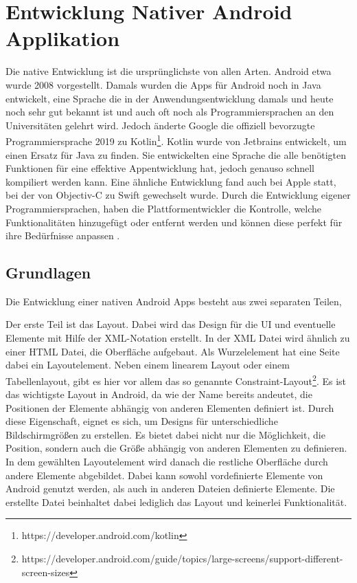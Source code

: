 \section{Entwicklung Nativer Android Applikation}
Die native Entwicklung ist die ursprünglichste von allen Arten. Android etwa wurde 2008 vorgestellt. 
Damals wurden die Apps für Android noch in Java entwickelt, eine Sprache die in der Anwendungsentwicklung damals und heute noch sehr gut bekannt ist und auch oft noch als Programmiersprachen an den Universitäten gelehrt wird. 
Jedoch änderte Google die offiziell bevorzugte Programmiersprache 2019 zu Kotlin\footnote{https://developer.android.com/kotlin}. 
Kotlin wurde von Jetbrains entwickelt, um einen Ersatz für Java zu finden. 
Sie entwickelten eine Sprache die alle benötigten Funktionen für eine effektive Appentwicklung hat, jedoch genauso schnell kompiliert werden kann. 
Eine ähnliche Entwicklung fand auch bei Apple statt, bei der von Objectiv-C zu Swift gewechselt wurde. 
Durch die Entwicklung eigener Programmiersprachen, haben die Plattformentwickler die Kontrolle, welche Funktionalitäten hinzugefügt oder entfernt werden und können diese perfekt für ihre Bedürfnisse anpassen \cite{medium_Swift_Kotlin}.

\subsection{Grundlagen}
Die Entwicklung einer nativen Android \acp{App} besteht aus zwei separaten Teilen, 

Der erste Teil ist das Layout. Dabei wird das Design für die UI und eventuelle Elemente mit Hilfe der XML-Notation erstellt.
In der XML Datei wird ähnlich zu einer HTML Datei, die Oberfläche aufgebaut. Als Wurzelelement hat eine Seite dabei ein Layoutelement. Neben einem linearem Layout oder einem Tabellenlayout, gibt es hier vor allem das so genannte Constraint-Layout\footnote{https://developer.android.com/guide/topics/large-screens/support-different-screen-sizes}. 
Es ist das wichtigste Layout in Android, da wie der Name bereits andeutet, die Positionen der Elemente abhängig von anderen Elementen definiert ist. Durch diese Eigenschaft, eignet es sich, um Designs für unterschiedliche Bildschirmgrößen zu erstellen. Es bietet dabei nicht nur die Möglichkeit, die Position, sondern auch die Größe abhängig von anderen Elementen zu definieren. In dem gewählten Layoutelement wird danach die restliche Oberfläche durch andere Elemente abgebildet. Dabei kann sowohl vordefinierte Elemente von Android genutzt werden, als auch in anderen Dateien definierte Elemente. Die erstellte Datei beinhaltet dabei lediglich das Layout und keinerlei Funktionalität.

